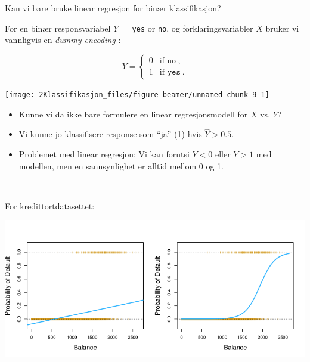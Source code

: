 \documentclass[10pt,ignorenonframetext,]{beamer}
\providecommand{\tightlist}{%
  \setlength{\itemsep}{0pt}\setlength{\parskip}{0pt}}
\begin{document}
\begin{frame}[fragile]

\begin{block}{Kan vi bare bruke linear regresjon for binær
klassifikasjon?}

\vspace{1mm}

For en binær responsvariabel \(Y =\) \texttt{yes} or \texttt{no}, og
forklaringsvariabler \(X\) bruker vi vannligvis en \emph{dummy encoding}
:

\[Y = \left\{ \begin{array}{ll}
0 & \text{if } \texttt{no} \ , \\
1 & \text{if } \texttt{yes} \ .
\end{array} \right.\]

\vspace{6mm}

\begin{center}\texttt{[image: 2Klassifikasjon\_files/figure-beamer/unnamed-chunk-9-1]} \end{center}

\end{block}

\end{frame}

\begin{frame}

\begin{itemize}
\item
  Kunne vi da ikke bare formulere en linear regresjonsmodell for \(X\)
  vs. \(Y\)?
\item
  Vi kunne jo klassifisere response som ``ja'' (1) hvis
  \(\hat{Y}> 0.5\).
\end{itemize}

\vspace{2mm}

\begin{itemize}
\tightlist
\item
  Problemet med linear regresjon: Vi kan forutsi \(Y<0\) eller \(Y>1\)
  med modellen, men en sannsynlighet er alltid mellom 0 og 1.
\end{itemize}

\(~\)

For kredittortdatasettet:

\includegraphics{4.2.png}

\end{frame}
\end{document}
